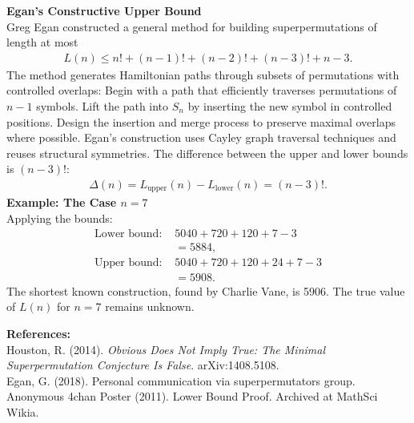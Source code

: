 \begin{technical}
\noindent\textbf{Egan's Constructive Upper Bound}\\
Greg Egan constructed a general method for building superpermutations of length at most
\begin{align*}
L(n) \leq n! + (n-1)! + (n-2)! + (n-3)! + n - 3.
\end{align*}
The method generates Hamiltonian paths through subsets of permutations with controlled overlaps: Begin with a path that efficiently traverses permutations of $n-1$ symbols. Lift the path into $S_n$ by inserting the new symbol in controlled positions. Design the insertion and merge process to preserve maximal overlaps where possible. Egan's construction uses Cayley graph traversal techniques and reuses structural symmetries. The difference between the upper and lower bounds is $(n-3)!$:
\begin{align*}
\Delta(n) = L_{\text{upper}}(n) - L_{\text{lower}}(n) = (n-3)!.
\end{align*}
\noindent\textbf{Example: The Case $n = 7$}\\
Applying the bounds:
\begin{align}
\text{Lower bound: } & 5040 + 720 + 120 + 7 - 3\\
 &= 5884, \\
\text{Upper bound: } & 5040 + 720 + 120 + 24 + 7 - 3\\
 &= 5908.
\end{align}
The shortest known construction, found by Charlie Vane, is 5906. The true value of $L(n)$ for $n = 7$ remains unknown.

\noindent\textbf{References:}\\
Houston, R. (2014). \textit{Obvious Does Not Imply True: The Minimal Superpermutation Conjecture Is False}. arXiv:1408.5108.\\
Egan, G. (2018). Personal communication via superpermutators group.\\
Anonymous 4chan Poster (2011). Lower Bound Proof. Archived at MathSci Wikia.
\end{technical}
